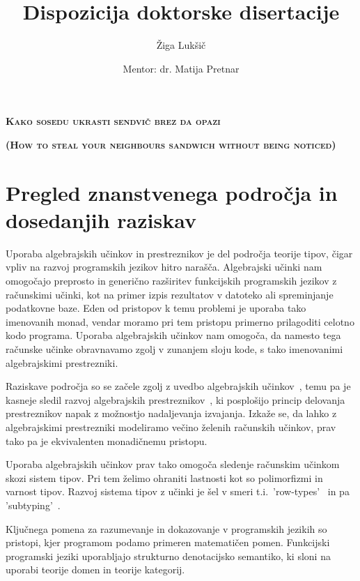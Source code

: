 \documentclass{article}
\title{Dispozicija doktorske disertacije}
\author{Žiga Lukšič \and Mentor: dr. Matija Pretnar}
\date{}
\begin{document}
\maketitle

\vspace{-10mm}
\begin{center}
  \Large{\textsc{\textbf{Kako sosedu ukrasti sendvič brez da opazi}}}

  \Large{\textsc{\textbf{(How to steal your neighbours sandwich without being noticed)}}}
\end{center}

\section*{Pregled znanstvenega področja in dosedanjih raziskav}

Uporaba algebrajskih učinkov in prestreznikov je del področja teorije tipov, čigar vpliv na razvoj programskih jezikov hitro narašča. Algebrajski učinki nam omogočajo preprosto in generično razširitev funkcijskih programskih jezikov z računskimi učinki, kot na primer izpis rezultatov v datoteko ali spreminjanje podatkovne baze. Eden od pristopov k temu problemi je uporaba tako imenovanih monad, vendar moramo pri tem pristopu primerno prilagoditi celotno kodo programa. Uporaba algebrajskih učinkov nam omogoča, da namesto tega računske učinke obravnavamo zgolj v zunanjem sloju kode, s tako imenovanimi algebrajskimi prestrezniki.

Raziskave področja so se začele zgolj z uvedbo algebrajskih učinkov~\cite{DBLP:conf/fossacs/PlotkinP01, DBLP:journals/acs/PlotkinP03}, temu pa je kasneje sledil razvoj algebrajskih prestreznikov~\cite{DBLP:conf/esop/PlotkinP09}, ki posplošijo princip delovanja prestreznikov napak z možnostjo nadaljevanja izvajanja. Izkaže se, da lahko z algebrajskimi prestrezniki modeliramo večino želenih računskih učinkov, prav tako pa je ekvivalenten monadičnemu pristopu. 

Uporaba algebrajskih učinkov prav tako omogoča sledenje računskim učinkom skozi sistem tipov. Pri tem želimo ohraniti lastnosti kot so polimorfizmi in varnost tipov. Razvoj sistema tipov z učinki je šel v smeri t.i.\ 'row-types'~\cite{DBLP:conf/icfp/HillerstromL16} in pa 'subtyping'~\cite{DBLP:conf/esop/SalehKPS18}. 

Ključnega pomena za razumevanje in dokazovanje v programskih jezikih so pristopi, kjer programom podamo primeren matematičen pomen. Funkcijski programski jeziki uporabljajo strukturno denotacijsko semantiko, ki sloni na uporabi teorije domen in teorije kategorij.
\end{document}
